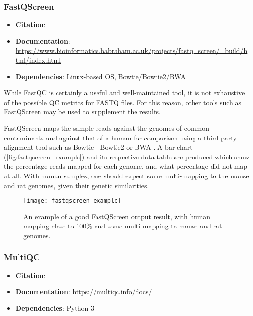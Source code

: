 \subsubsection{FastQScreen}
\begin{itemize}\itemsep-0.5em
\item[] \textbf{Citation}: 				\cite{wingett2018fastq}
\item[] \textbf{Documentation}: 	\url{https://www.bioinformatics.babraham.ac.uk/projects/fastq_screen/_build/html/index.html}
\item[] \textbf{Dependencies}: Linux-based OS, Bowtie/Bowtie2/BWA
\end{itemize}

While FastQC is certainly a useful and well-maintained tool, it is not exhaustive of the possible QC metrics for FASTQ files. For this reason, other tools such as FastQScreen may be used to supplement the results.

FastQScreen maps the sample reads against the genomes of common contaminants and against that of a human for comparison using a third party alignment tool such as Bowtie \citep{bowtie}, Bowtie2 \citep{bowtie2} or BWA \citep{bwa}. A bar chart (\autoref{fig:fastqscreen_example}) and its respective data table are produced which show the percentage reads mapped for each genome, and what percentage did not map at all. With human samples, one should expect some multi-mapping to the mouse and rat genomes, given their genetic similarities.
\clearpage
\begin{figure}[!h]
    \centering
    \texttt{[image: fastqscreen\_example]}
    \caption[FastQScreen plot example]{An example of a good FastQScreen output result, with human mapping close to 100\% and some multi-mapping to mouse and rat genomes. } 
    \label{fig:fastqscreen_example}
\end{figure}

\subsubsection{MultiQC}

\begin{itemize}\itemsep-0.5em
\item[] \textbf{Citation}: 				\cite{multiqc}
\item[] \textbf{Documentation}: 	\url{https://multiqc.info/docs/}
\item[] \textbf{Dependencies}:  Python 3
\end{itemize}


